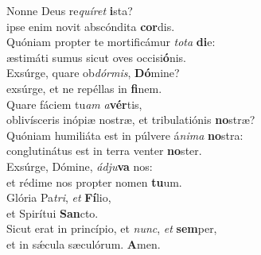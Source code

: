 \evenverse Nonne Deus re\textit{quí}\textit{ret} \textbf{i}sta?~\*\\
\evenverse ipse enim novit abscóndita \textbf{cor}dis.\\
\oddverse Quóniam propter te mortificámur \textit{to}\textit{ta} \textbf{di}e:~\*\\
\oddverse æstimáti sumus sicut oves occisi\textbf{ó}nis.\\
\evenverse Exsúrge, quare ob\textit{dór}\textit{mis}, \textbf{Dó}mine?~\*\\
\evenverse exsúrge, et ne repéllas in \textbf{fi}nem.\\
\oddverse Quare fáciem tu\textit{am} \textit{a}\textbf{vér}tis,~\*\\
\oddverse oblivísceris inópiæ nostræ, et tribulatiónis \textbf{no}stræ?\\
\evenverse Quóniam humiliáta est in púlvere á\textit{ni}\textit{ma} \textbf{no}stra:~\*\\
\evenverse conglutinátus est in terra venter \textbf{no}ster.\\
\oddverse Exsúrge, Dómine, \textit{ád}\textit{ju}\textbf{va} nos:~\*\\
\oddverse et rédime nos propter nomen \textbf{tu}um.\\
\evenverse Glória Pa\textit{tri}, \textit{et} \textbf{Fí}lio,~\*\\
\evenverse et Spirítui \textbf{San}cto.\\
\oddverse Sicut erat in princípio, et \textit{nunc}, \textit{et} \textbf{sem}per,~\*\\
\oddverse et in sǽcula sæculórum. \textbf{A}men.\\
